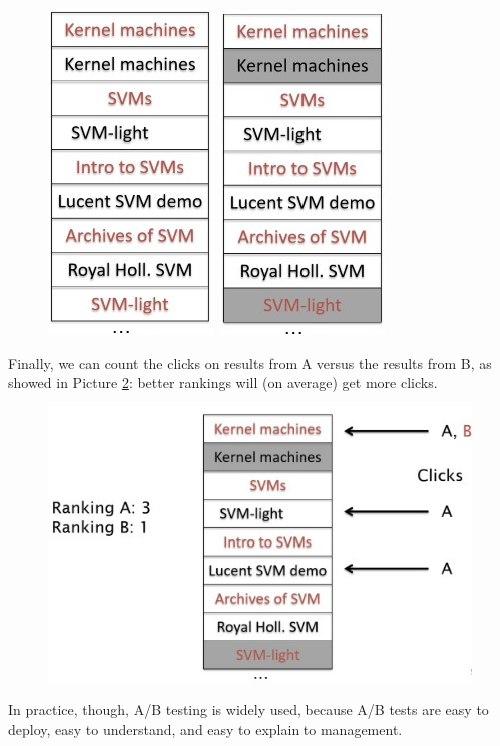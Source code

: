 \begin{figure}[h!]
		\centering
		\includegraphics[scale = 2.0]{img/ab1.jpg}
        \includegraphics[scale = 2.0]{img/ab2.jpg}
		\label{ab1}
\end{figure}

Finally, we can count the clicks on results from A versus the results from B, as showed in Picture \ref{ab2}: better rankings will (on average) get more clicks.

\begin{figure}[h!]
		\centering
		\includegraphics[scale = 2.0]{img/ab3.jpg}
		\label{ab2}
\end{figure}

In practice, though, A/B testing is widely used, because A/B tests are easy to deploy, easy to understand, and easy to explain to management.